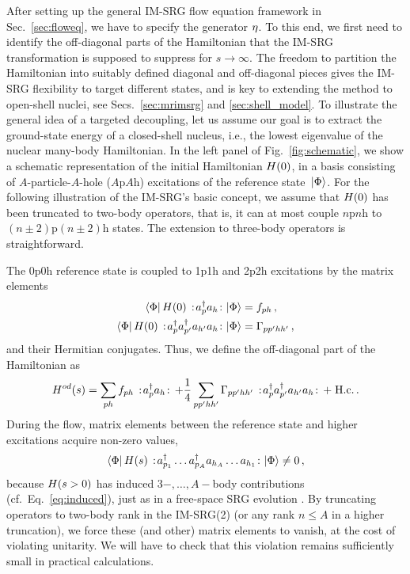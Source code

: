 After setting up the general IM-SRG flow equation framework in Sec.~\ref{sec:floweq}, we have to specify the generator $\eta$. To this end, we first need to identify the off-diagonal parts of the Hamiltonian that the IM-SRG transformation is supposed to suppress for $s\to\infty$. The freedom to partition the Hamiltonian into suitably defined diagonal and off-diagonal pieces gives the IM-SRG flexibility to target different states, and is key to extending the method to open-shell nuclei, see Secs.~\ref{sec:mrimsrg} and \ref{sec:shell_model}. To illustrate the general idea of a targeted decoupling, let us assume our goal is to extract the ground-state energy of a closed-shell nucleus, i.e., the lowest eigenvalue of the nuclear many-body Hamiltonian. In the left panel of Fig.~\ref{fig:schematic}, we show a schematic representation of the initial Hamiltonian $H(0)$, in a basis consisting of $A$-particle-$A$-hole ($A$p$A$h) excitations of the reference state $\,|{\Phi}\rangle$. For the following illustration of the IM-SRG's basic concept, we assume that $H(0)$ has been truncated to two-body operators, that is, it can at most couple $n$p$n$h to $(n\pm2)$p$(n\pm2)$h states. The extension to three-body operators is straightforward. 

The 0p0h reference state is coupled to 1p1h and 2p2h excitations by the matrix elements
\begin{align}
  \matrixe{\Phi}{\HO(0)\nord{\aaO_{p}\aO_{h}}}{\Phi}&=f_{ph}\,,\label{eq:fod}\\
  \matrixe{\Phi}{\HO(0)\nord{\aaO_{p}\aaO_{p'}\aO_{h'}\aO_{h}}}{\Phi}&=\Gamma_{pp'hh'}\label{eq:Gammaod}\,,
\end{align}
and their Hermitian conjugates. Thus, we define the off-diagonal part of the Hamiltonian as
\begin{equation}
  \HO^{od}(s) = \sum_{ph}f_{ph}\nord{\aaO_p\aO_h} + \frac{1}{4}\sum_{pp'hh'}\Gamma_{pp'hh'}\nord{\aaO_p\aaO_{p'}\aO_{h'}\aO_h}
                +\; \text{H.c.}\label{eq:def_Hod}\,.
\end{equation}
During the flow, matrix elements between the reference state and higher excitations acquire non-zero values,
\begin{equation}\label{eq:induced_od}
  \matrixe{\Phi}{\HO(s)\nord{\aaO_{p_1}\ldots\aaO_{p_A}\aO_{h_{A}}\ldots\aO_{h_1}}}{\Phi}\neq 0\,,
\end{equation}
because $H(s>0)$ has induced $3-,\ldots,A-$body contributions (cf.~Eq.~\eqref{eq:induced}), just as in a 
free-space SRG evolution \cite{Bogner:2010pq,Jurgenson:2009bs,Hebeler:2012ly}. By truncating operators to 
two-body rank in the IM-SRG(2) (or any rank $n\leq A$ in a higher truncation), we force these (and other) 
matrix elements to vanish, at the cost of violating unitarity. We will have to check that this violation 
remains sufficiently small in practical calculations.

